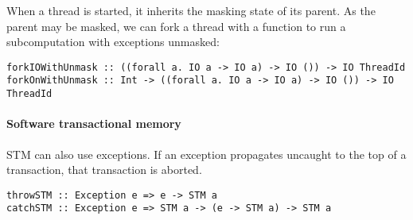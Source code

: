 When a thread is started, it inherits the masking state of its parent.  As the
parent may be masked, we can fork a thread with a function to run a
subcomputation with exceptions unmasked:

\begin{verbatim}
forkIOWithUnmask :: ((forall a. IO a -> IO a) -> IO ()) -> IO ThreadId
forkOnWithUnmask :: Int -> ((forall a. IO a -> IO a) -> IO ()) -> IO ThreadId
\end{verbatim}

\paragraph{Software transactional memory}
STM can also use exceptions.  If an exception propagates uncaught to the top of
a transaction, that transaction is aborted.

\begin{verbatim}
throwSTM :: Exception e => e -> STM a
catchSTM :: Exception e => STM a -> (e -> STM a) -> STM a
\end{verbatim}
